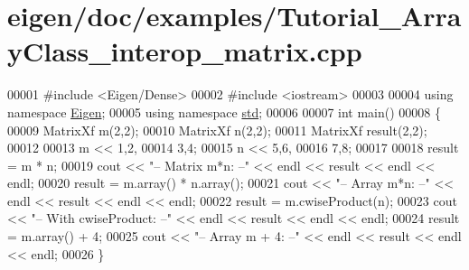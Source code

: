 \hypertarget{eigen_2doc_2examples_2_tutorial___array_class__interop__matrix_8cpp_source}{}\section{eigen/doc/examples/\+Tutorial\+\_\+\+Array\+Class\+\_\+interop\+\_\+matrix.cpp}
\label{eigen_2doc_2examples_2_tutorial___array_class__interop__matrix_8cpp_source}

\begin{DoxyCode}
00001 \textcolor{preprocessor}{#include <Eigen/Dense>}
00002 \textcolor{preprocessor}{#include <iostream>}
00003 
00004 \textcolor{keyword}{using namespace }\hyperlink{namespace_eigen}{Eigen};
00005 \textcolor{keyword}{using namespace }\hyperlink{namespacestd}{std};
00006 
00007 \textcolor{keywordtype}{int} main()
00008 \{
00009   MatrixXf m(2,2);
00010   MatrixXf n(2,2);
00011   MatrixXf result(2,2);
00012 
00013   m << 1,2,
00014        3,4;
00015   n << 5,6,
00016        7,8;
00017 
00018   result = m * n;
00019   cout << \textcolor{stringliteral}{"-- Matrix m*n: --"} << endl << result << endl << endl;
00020   result = m.array() * n.array();
00021   cout << \textcolor{stringliteral}{"-- Array m*n: --"} << endl << result << endl << endl;
00022   result = m.cwiseProduct(n);
00023   cout << \textcolor{stringliteral}{"-- With cwiseProduct: --"} << endl << result << endl << endl;
00024   result = m.array() + 4;
00025   cout << \textcolor{stringliteral}{"-- Array m + 4: --"} << endl << result << endl << endl;
00026 \}
\end{DoxyCode}
